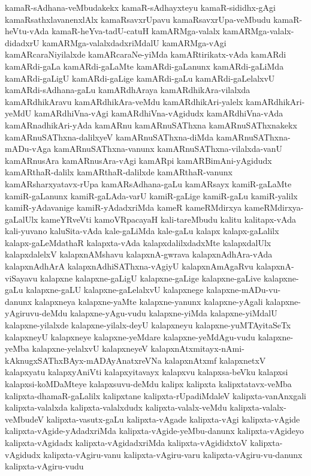 {kamaR-sAdhana-veMbudakekx
kamaR-sAdhayxteyu
kamaR-sididhx-gAgi
kamaRsathxlavanenxlAlx
kamaRsavxrUpavu
kamaRsavxrUpa-veMbudu
kamaR-heVtu-vAda
kamaR-heYva-tadU-catuH
kamARMga-valalx
kamARMga-valalx-didadxrU
kamARMga-valalxdadxriMdalU
kamARMga-vAgi
kamARcaraNiyilalxde
kamARcaraNe-yiMda
kamARtirikatx-vAda
kamARdi
kamARdi-gaLa
kamARdi-gaLaMte
kamARdi-gaLanunx
kamARdi-gaLiMda
kamARdi-gaLigU
kamARdi-gaLige
kamARdi-gaLu
kamARdi-gaLelalxvU
kamARdi-sAdhana-gaLu
kamARdhAraya
kamARdhikAra-vilalxda
kamARdhikAravu
kamARdhikAra-veMdu
kamARdhikAri-yalelx
kamARdhikAri-yeMdU
kamARdhiVna-vAgi
kamARdhiVna-vAgidudx
kamARdhiVna-vAda
kamARnadhikAri-yAda
kamARnu
kamARnuSAThxna
kamARnuSAThxnakekx
kamARnuSAThxna-dalilxyeV
kamARnuSAThxna-diMda
kamARnuSAThxna-mADu-vAga
kamARnuSAThxna-vanunx
kamARnuSAThxna-vilalxda-vanU
kamARnusAra
kamARnusAra-vAgi
kamARpi
kamARBimAni-yAgidudx
kamARthaR-dalilx
kamARthaR-dalilxde
kamARthaR-vanunx
kamARsharxyatavx-rUpa
kamARsAdhana-gaLu
kamARsayx
kamiR-gaLaMte
kamiR-gaLanunx
kamiR-gaLAda-varU
kamiR-gaLige
kamiR-gaLu
kamiR-yalilx
kamiR-yAdavanige
kamiR-yAdadxriMda
kameR
kameRMdirxya
kameRMdirxya-gaLalUlx
kameYRveVti
kamoVRpacayaH
kali-tareMbudu
kalitu
kalitapx-vAda
kali-yuvano
kaluSita-vAda
kale-gaLiMda
kale-gaLu
kalapx
kalapx-gaLalilx
kalapx-gaLeMdathaR
kalapxta-vAda
kalapxdalilxdadxMte
kalapxdalUlx
kalapxdalelxV
kalapxnAMshavu
kalapxnA-gwrava
kalapxnAdhAra-vAda
kalapxnAdhArA
kalapxnAdhiSAThxna-vAgiyU
kalapxnAmAgaRvu
kalapxnA-viSayavu
kalapxne
kalapxne-gaLigU
kalapxne-gaLige
kalapxne-gaLive
kalapxne-gaLu
kalapxne-gaLU
kalapxne-gaLelalxvU
kalapxnege
kalapxne-mADu-vu-danunx
kalapxneya
kalapxne-yaMte
kalapxne-yanunx
kalapxne-yAgali
kalapxne-yAgiruvu-deMdu
kalapxne-yAgu-vudu
kalapxne-yiMda
kalapxne-yiMdalU
kalapxne-yilalxde
kalapxne-yilalx-deyU
kalapxneyu
kalapxne-yuMTAyitaSeTx
kalapxneyU
kalapxneye
kalapxne-yeMdare
kalapxne-yeMdAgu-vudu
kalapxne-yeMba
kalapxne-yelalxvU
kalapxneyeV
kalapxnAtxmitayx-nAmi-kAknugxSAThxBAyx-mADAyAnatxreVNa
kalapxnAtxmf
kalapxnetxV
kalapxyatu
kalapxyAniVti
kalapxyitavayx
kalapxvu
kalapxsa-beVku
kalapxsi
kalapxsi-koMDaMteye
kalapxsuvu-deMdu
kalipx
kalipxta
kalipxtatavx-veMba
kalipxta-dhamaR-gaLalilx
kalipxtane
kalipxta-rUpadiMdaleV
kalipxta-vanAnxgali
kalipxta-valalxda
kalipxta-valalxdudx
kalipxta-valalx-veMdu
kalipxta-valalx-veMbudeV
kalipxta-vasutx-gaLu
kalipxta-vAgade
kalipxta-vAgi
kalipxta-vAgide
kalipxta-vAgide-yAdadxriMda
kalipxta-vAgide-yeMbu-danunx
kalipxta-vAgideyo
kalipxta-vAgidadx
kalipxta-vAgidadxriMda
kalipxta-vAgididxtoV
kalipxta-vAgidudx
kalipxta-vAgiru-vanu
kalipxta-vAgiru-varu
kalipxta-vAgiru-vu-danunx
kalipxta-vAgiru-vudu
}
